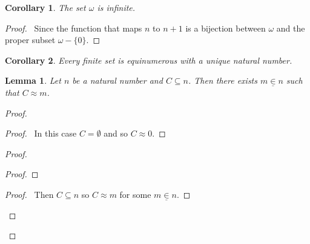 \documentclass{article}
\let\qed\relax
\newtheorem{lemma}[axiom]{Lemma}
\newtheorem{corollary}{Corollary}[axiom]
\theoremstyle{definition}
\begin{document}
    \begin{corollary}
        The set $\omega$ is infinite.
    \end{corollary}

    \begin{proof}
        \pf\ Since the function that maps $n$ to $n+1$ is a bijection between $\omega$ and the proper
        subset $\omega - \{ 0 \}$. \qed
    \end{proof}

    \begin{corollary}
        Every finite set is equinumerous with a unique natural number.
    \end{corollary}

    \begin{lemma}
        Let $n$ be a natural number and $C \subseteq n$. Then there exists $m \underline{\in} n$ such that $C \approx m$.
    \end{lemma}

    \begin{proof}
        \pf
        \begin{proof}
            \pf\ In this case $C = \emptyset$ and so $C \approx 0$.
        \end{proof}
        \begin{proof}
            \begin{proof}
            \end{proof}
            \begin{proof}
                \pf\ Then $C \subseteq n$ so $C \approx m$ for some $m \underline{\in} n$.
            \end{proof}
        \end{proof}
        \qed
    \end{proof}
\end{document}
